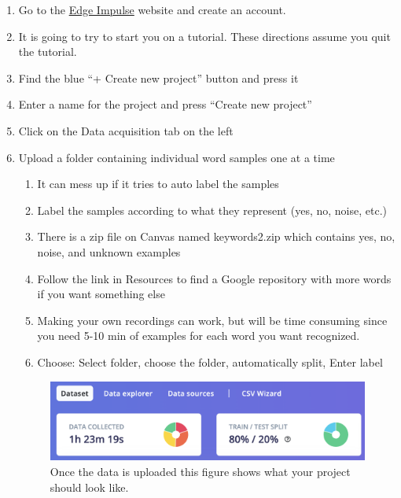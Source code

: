 \begin{enumerate}
  \item Go to the \href{https://edgeimpulse.com/}{Edge Impulse} website and create an 
account. 
  \item It is going to try to start you on a tutorial. These directions assume you quit 
      the tutorial.
  \item Find the blue ``+ Create new project'' button and press it 
  \item Enter a name for the project and press ``Create new project''
  \item Click on the Data acquisition tab on the left
  \item Upload a folder containing individual word samples one at a time
  \begin{enumerate}
    \item It can mess up if it tries to auto label the samples
    \item Label the samples according to what they represent (yes, no, noise, etc.)
    \item There is a zip file on Canvas named keywords2.zip which contains yes, no, noise, and unknown examples
    \item Follow the link in Resources to find a Google repository with more words if you want something else
    \item Making your own recordings can work, but will be time consuming since you need 5-10 min of examples 
            for each word you want recognized.
    \item Choose: Select folder, choose the folder, automatically split, Enter label
  \end{enumerate}

  \begin{figure}[!htb]
    \centering
    \includegraphics[scale=0.6]{machineLearning/data.png}
    \caption{Once the data is uploaded this figure shows what your project should look like.}
    \label{fig:edgeimpulsedata}
  \end{figure} 


\end{enumerate}
